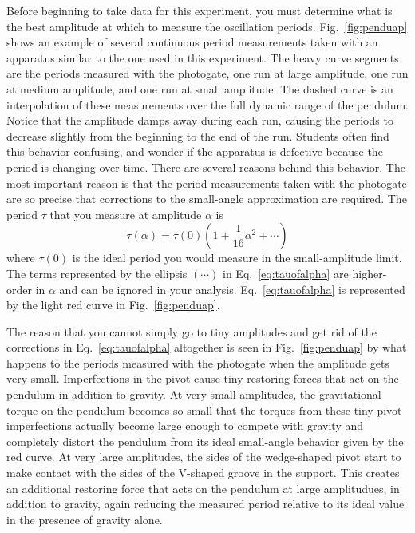 \documentclass{revtex4}
\begin{document}
Before beginning to take data for this experiment, you must determine
what is the best amplitude at which to measure the oscillation periods.
Fig.~\ref{fig:penduap} shows an example of several continuous period
measurements taken with an apparatus similar to the one used in this
experiment.  The heavy curve segments are the periods measured with the
photogate, one run at large amplitude, one run at medium amplitude, and
one run at small amplitude.  The dashed curve is an interpolation of these
measurements over the full dynamic range of the pendulum.
Notice that the amplitude damps away during each run, causing the
periods to decrease slightly from the beginning to the end of the run.
Students often find this behavior confusing, and wonder if the apparatus
is defective because the period is changing over time.  There are several
reasons behind this behavior.  The most important reason is that the
period measurements taken with the photogate are so precise that
corrections to the small-angle approximation are required.
The period $\tau$ that you measure at amplitude $\alpha$ is
\begin{equation}
\tau(\alpha) = \tau(0) \left(1+\frac{1}{16}\alpha^2 + \cdots\right)
\label{eq:tauofalpha}
\end{equation}
where $\tau(0)$ is the ideal period you would measure in the small-amplitude
limit.  The terms represented by the ellipsis $(\cdots)$ in
Eq.~\ref{eq:tauofalpha} are higher-order in $\alpha$ and can be ignored
in your analysis.  Eq.~\ref{eq:tauofalpha} is represented by the light
red curve in Fig.~\ref{fig:penduap}.

The reason that you cannot simply
go to tiny amplitudes and get rid of the corrections in Eq.~\ref{eq:tauofalpha}
altogether is seen in Fig.~\ref{fig:penduap} by what happens to the periods
measured with the photogate when the amplitude gets very small.  Imperfections
in the pivot cause tiny restoring forces that act on the pendulum in addition
to gravity.  At very small amplitudes, the gravitational torque on the
pendulum becomes so small that the torques from these tiny pivot
imperfections actually become large enough to compete with gravity and
completely distort the pendulum from its ideal small-angle behavior given
by the red curve.  At very large amplitudes, the sides of the wedge-shaped pivot
start to make contact with the sides of the V-shaped groove in the support.
This creates an additional restoring force that acts on the pendulum at
large amplitudues, in addition to gravity, again reducing the measured
period relative to its ideal value in the presence of gravity alone.
\end{document}
